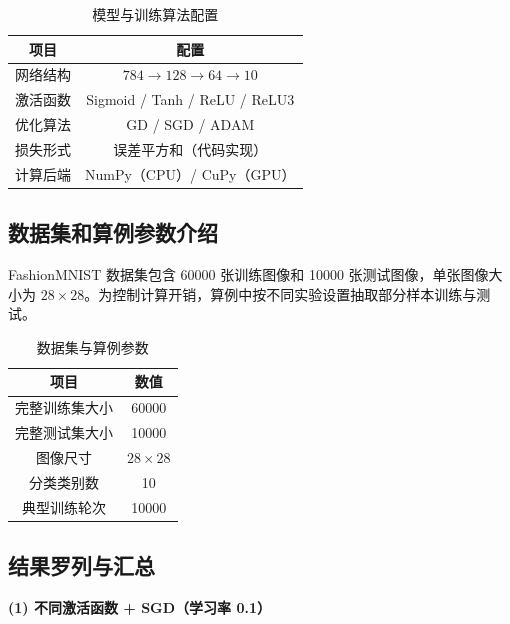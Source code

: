 \documentclass[a4paper,10pt,twocolumn]{article}
\begin{document}
\begin{table}[H]
\centering
\small
\caption{模型与训练算法配置}
\begin{tabular}{c|c}
\toprule
项目 & 配置 \\
\midrule
网络结构 & $784\rightarrow 128\rightarrow 64\rightarrow 10$ \\
激活函数 & Sigmoid / Tanh / ReLU / ReLU3 \\
优化算法 & GD / SGD / ADAM \\
损失形式 & 误差平方和（代码实现） \\
计算后端 & NumPy（CPU）/ CuPy（GPU） \\
\bottomrule
\end{tabular}
\end{table}

\subsection{数据集和算例参数介绍}

FashionMNIST 数据集包含 60000 张训练图像和 10000 张测试图像，单张图像大小为 $28\times 28$。为控制计算开销，算例中按不同实验设置抽取部分样本训练与测试。

\begin{table}[H]
\centering
\small
\caption{数据集与算例参数}
\begin{tabular}{c|c}
\toprule
项目 & 数值 \\
\midrule
完整训练集大小 & 60000 \\
完整测试集大小 & 10000 \\
图像尺寸 & $28\times 28$ \\
分类类别数 & 10 \\
典型训练轮次 & 10000 \\
\bottomrule
\end{tabular}
\end{table}

\subsection{结果罗列与汇总}

\textbf{(1) 不同激活函数 + SGD（学习率 0.1）}

\begin{table}[H]
\centering
\scriptsize
\caption{不同激活函数在 SGD 下的结果}
\end{table}
\end{document}
